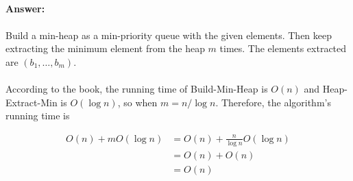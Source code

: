 \documentclass{article}
\begin{document}
\paragraph{Answer:}

\paragraph{}
Build a min-heap as a min-priority queue with the given elements. Then keep extracting the minimum element from the heap $m$ times. The elements extracted are $(b_1,\dots,b_m)$.

\paragraph{}
According to the book, the running time of Build-Min-Heap is $O(n)$ and Heap-Extract-Min is $O(\log n)$, so when $m=n/\log n$. Therefore, the algorithm's running time is

$$\begin{aligned}
O(n)+mO(\log n)&=O(n)+\frac{n}{\log n}O(\log n)\\
&=O(n)+O(n)\\
&=O(n)
\end{aligned}$$
\end{document}
